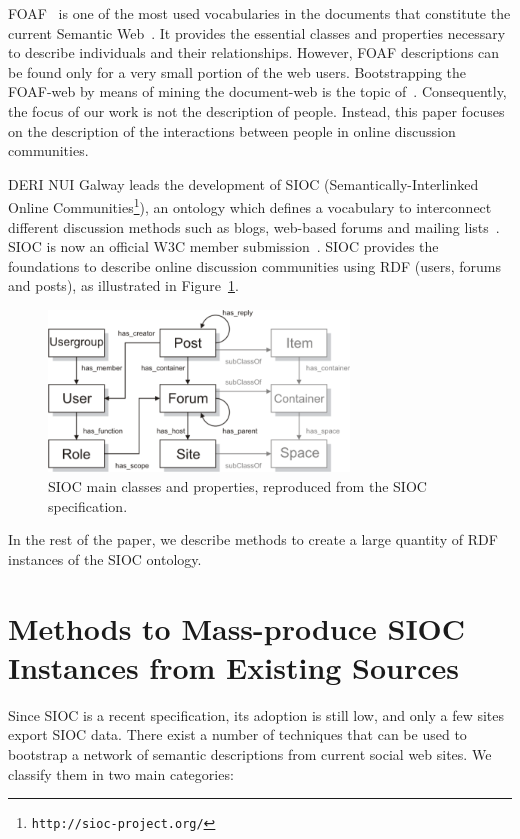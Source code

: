 \documentclass{../templates/www2008-submission}
\begin{document}
FOAF~\cite{FOAF} is one of the most used vocabularies in the documents that
constitute the current Semantic Web~\cite{Ding2005, Finin2005}.
It provides the essential classes and properties necessary
to describe individuals
and their relationships. However, FOAF descriptions can be found
only for a very small portion of the web users. Bootstrapping the
FOAF-web by means of mining the document-web is the topic
of~\cite{Mika2004}. Consequently, the focus of our work is not the
description of people. Instead, this paper focuses on the description
of the interactions between people in online discussion communities.

DERI NUI Galway leads the development of SIOC (Seman\-ti\-cally-Interlinked Online
Communities\footnote{\texttt{http://sioc-project.org/}}), an ontology which 
defines a vocabulary to interconnect different discussion methods such 
as blogs, web-based forums and mailing lists~\cite{Breslin2006}.
SIOC is now an official W3C member submission~\cite{Bojars2007}.
SIOC provides the foundations to describe online discussion
communities using RDF (users, forums and posts), as illustrated in
Figure~\ref{fig:sioc}.

\begin{figure}
 \centering
 \includegraphics[width=8cm]{images/sioc.png}
 \caption{\label{fig:sioc}SIOC main classes and properties, reproduced from the SIOC specification.}
\end{figure}

In the rest of the paper, we describe methods to create a large
quantity of RDF instances of the SIOC ontology.


\section{Methods to Mass-produce SIOC Instances from Existing Sources}\label{sec:taxonomy}

Since SIOC is a recent specification, its adoption is still low, and
only a few sites export SIOC data. There exist a number of techniques
that can be used to bootstrap a network of semantic descriptions from
current social web sites. We classify them in two main categories:
\end{document}
